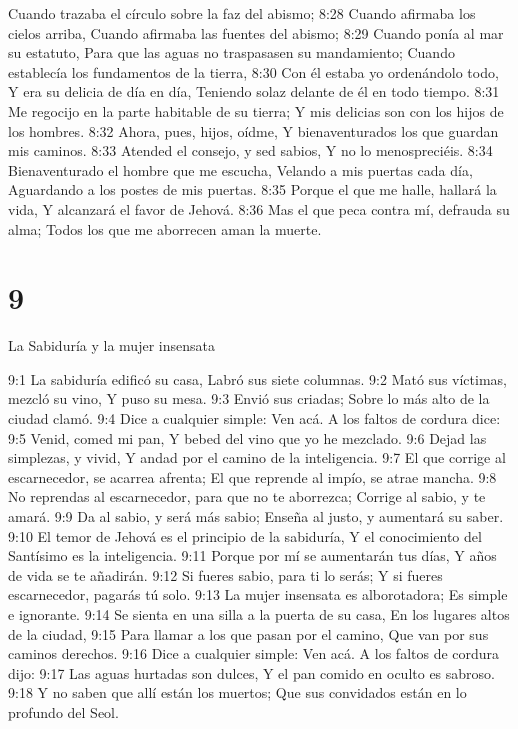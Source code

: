 Cuando trazaba el círculo sobre la faz del abismo;  
8:28 Cuando afirmaba los cielos arriba,  
Cuando afirmaba las fuentes del abismo;  
8:29 Cuando ponía al mar su estatuto,  
Para que las aguas no traspasasen su mandamiento;  
Cuando establecía los fundamentos de la tierra,  
8:30 Con él estaba yo ordenándolo todo,  
Y era su delicia de día en día,  
Teniendo solaz delante de él en todo tiempo.  
8:31 Me regocijo en la parte habitable de su tierra;  
Y mis delicias son con los hijos de los hombres.  
8:32 Ahora, pues, hijos, oídme,  
Y bienaventurados los que guardan mis caminos.  
8:33 Atended el consejo, y sed sabios,  
Y no lo menospreciéis.  
8:34 Bienaventurado el hombre que me escucha,  
Velando a mis puertas cada día,  
Aguardando a los postes de mis puertas. 
8:35 Porque el que me halle, hallará la vida,  
Y alcanzará el favor de Jehová.  
8:36 Mas el que peca contra mí, defrauda su alma;  
Todos los que me aborrecen aman la muerte. 

\chapter{9}

La Sabiduría y la mujer insensata  

9:1 La sabiduría edificó su casa,  
Labró sus siete columnas.  
9:2 Mató sus víctimas, mezcló su vino,  
Y puso su mesa.  
9:3 Envió sus criadas;  
Sobre lo más alto de la ciudad clamó.  
9:4 Dice a cualquier simple: Ven acá.  
A los faltos de cordura dice:  
9:5 Venid, comed mi pan,  
Y bebed del vino que yo he mezclado.  
9:6 Dejad las simplezas, y vivid,  
Y andad por el camino de la inteligencia.  
9:7 El que corrige al escarnecedor, se acarrea afrenta;  
El que reprende al impío, se atrae mancha.  
9:8 No reprendas al escarnecedor, para que no te aborrezca;  
Corrige al sabio, y te amará.  
9:9 Da al sabio, y será más sabio;  
Enseña al justo, y aumentará su saber.  
9:10 El temor de Jehová es el principio de la sabiduría, 
Y el conocimiento del Santísimo es la inteligencia.  
9:11 Porque por mí se aumentarán tus días,  
Y años de vida se te añadirán.  
9:12 Si fueres sabio, para ti lo serás;  
Y si fueres escarnecedor, pagarás tú solo.  
9:13 La mujer insensata es alborotadora;  
Es simple e ignorante.  
9:14 Se sienta en una silla a la puerta de su casa,  
En los lugares altos de la ciudad,  
9:15 Para llamar a los que pasan por el camino,  
Que van por sus caminos derechos.  
9:16 Dice a cualquier simple: Ven acá.  
A los faltos de cordura dijo:  
9:17 Las aguas hurtadas son dulces,  
Y el pan comido en oculto es sabroso.  
9:18 Y no saben que allí están los muertos;  
Que sus convidados están en lo profundo del Seol.  

